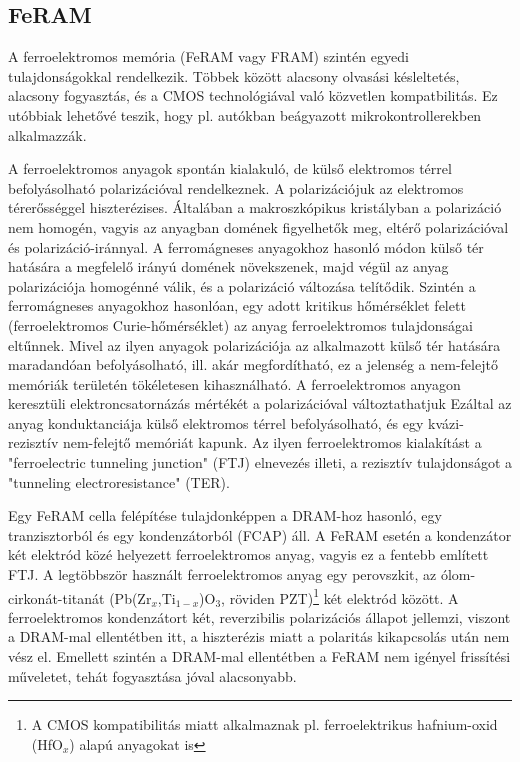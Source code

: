 \documentclass[twoside]{article}
\begin{document}
\subsection{FeRAM}
A ferroelektromos memória (FeRAM vagy FRAM) szintén egyedi tulajdonságokkal rendelkezik. Többek között alacsony olvasási késleltetés, alacsony fogyasztás, és a CMOS technológiával való közvetlen kompatbilitás. Ez utóbbiak lehetővé teszik, hogy pl. autókban beágyazott mikrokontrollerekben alkalmazzák. 
\par
A ferroelektromos anyagok spontán kialakuló, de külső elektromos térrel befolyásolható polarizációval rendelkeznek. A polarizációjuk az elektromos térerősséggel hiszterézises. Általában a makroszkópikus kristályban a polarizáció nem homogén, vagyis az anyagban domének figyelhetők meg, eltérő polarizációval és polarizáció-iránnyal. A ferromágneses anyagokhoz hasonló módon külső tér hatására a megfelelő irányú domének növekszenek, majd végül az anyag polarizációja homogénné válik, és a polarizáció változása telítődik.\cite{ferroelectricity} Szintén a ferromágneses anyagokhoz hasonlóan, egy adott kritikus hőmérséklet felett (ferroelektromos Curie-hőmérséklet) az anyag ferroelektromos tulajdonságai eltűnnek. Mivel az ilyen anyagok polarizációja az alkalmazott külső tér hatására maradandóan befolyásolható, ill. akár megfordítható, ez a jelenség a nem-felejtő memóriák területén tökéletesen kihasználható. A ferroelektromos anyagon keresztüli elektroncsatornázás mértékét a polarizációval változtathatjuk\cite{tsymbal2006} Ezáltal az anyag konduktanciája külső elektromos térrel befolyásolható, és egy kvázi-rezisztív nem-felejtő memóriát kapunk. Az ilyen ferroelektromos kialakítást a "ferroelectric tunneling junction" (FTJ) elnevezés illeti, a rezisztív tulajdonságot a "tunneling electroresistance" (TER)\cite{yin2021}.
\par
Egy FeRAM cella felépítése tulajdonképpen a DRAM-hoz hasonló, egy tranzisztorból és egy kondenzátorból (FCAP) áll. A FeRAM esetén a kondenzátor két elektród közé helyezett ferroelektromos anyag, vagyis ez a fentebb említett FTJ. A legtöbbször használt ferroelektromos anyag egy perovszkit, az ólom-cirkonát-titanát (Pb(Zr$_x$,Ti$_{1-x}$)O$_3$, röviden PZT)\footnote{A CMOS kompatibilitás miatt alkalmaznak pl. ferroelektrikus hafnium-oxid (HfO$_x$) alapú anyagokat is\cite{mehonic2023}} két elektród között. A ferroelektromos kondenzátort két, reverzibilis polarizációs állapot jellemzi, viszont a DRAM-mal ellentétben itt, a hiszterézis miatt a polaritás kikapcsolás után nem vész el. Emellett szintén a DRAM-mal ellentétben a FeRAM nem igényel frissítési műveletet, tehát fogyasztása jóval alacsonyabb.
\end{document}
